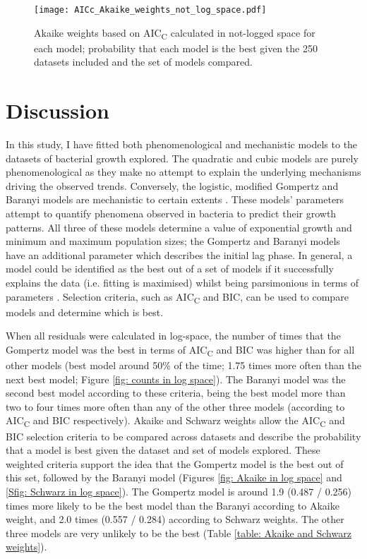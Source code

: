 \documentclass[11pt]{article}
\begin{document}
\begin{linenumbers}
        \begin{figure}[ht!]
            \centering
            \texttt{[image: AICc\_Akaike\_weights\_not\_log\_space.pdf]}
            \caption{Akaike weights based on AIC\textsubscript{C} calculated in not-logged space for each model; probability that each model is the best given the 250 datasets included and the set of models compared.}
            \label{fig: Akaike in not-log space}
        \end{figure}


    \section{Discussion}
    
        In this study, I have fitted both phenomenological and mechanistic models to the datasets of bacterial growth explored. The quadratic and cubic models are purely phenomenological as they make no attempt to explain the underlying mechanisms driving the observed trends. Conversely, the logistic, modified Gompertz and Baranyi models are mechanistic to certain extents \citep{ferrer_mathematical_2009}. These models' parameters attempt to quantify phenomena observed in bacteria to predict their growth patterns. All three of these models determine a value of exponential growth and minimum and maximum population sizes; the Gompertz and Baranyi models have an additional parameter which describes the initial lag phase. In general, a model could be identified as the best out of a set of models if it successfully explains the data (i.e. fitting is maximised) whilst being parsimonious in terms of parameters \citep{johnson_model_2004}. Selection criteria, such as AIC\textsubscript{C} and BIC, can be used to compare models and determine which is best.
        
        When all residuals were calculated in log-space, the number of times that the Gompertz model was the best in terms of AIC\textsubscript{C} and BIC was higher than for all other models (best model around 50\% of the time; 1.75 times more often than the next best model; Figure \ref{fig: counts in log space}). The Baranyi model was the second best model according to these criteria, being the best model more than two to four times more often than any of the other three models (according to AIC\textsubscript{C} and BIC respectively). Akaike and Schwarz weights allow the AIC\textsubscript{C} and BIC selection criteria to be compared across datasets and describe the probability that a model is best given the dataset and set of models explored. These weighted criteria support the idea that the Gompertz model is the best out of this set, followed by the Baranyi model (Figures \ref{fig: Akaike in log space} and \ref{Sfig: Schwarz in log space}). The Gompertz model is around 1.9 (0.487 / 0.256) times more likely to be the best model than the Baranyi according to Akaike weight, and 2.0 times (0.557 / 0.284) according to Schwarz weights. The other three models are very unlikely to be the best (Table \ref{table: Akaike and Schwarz weights}).
        

\end{linenumbers}
\end{document}
